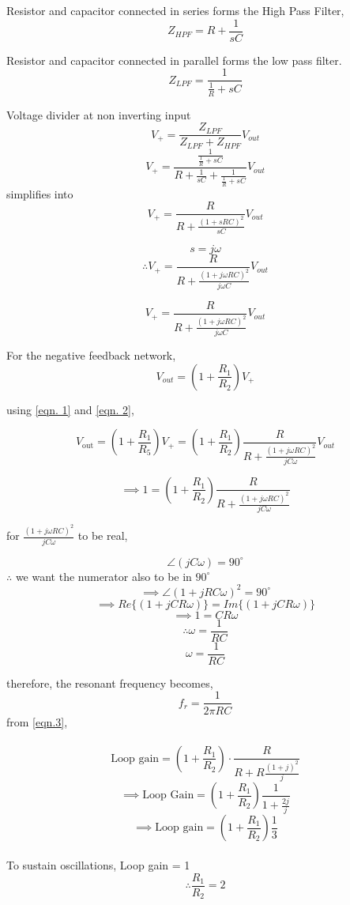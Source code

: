 Resistor and capacitor connected in series forms the High Pass Filter,
$$Z_{HPF} = R + \frac{1}{sC}$$

Resistor and capacitor connected in parallel forms the low pass filter.
$$Z_{LPF} = \frac{1}{\frac{1}{R} + sC}$$

Voltage divider at non inverting input
$$V_+ = \frac{Z_{LPF}}{Z_{LPF} + Z_{HPF}} V_{out}$$
$$V_+ = \frac{\frac{1}{\frac{1}{R} + sC}}{R + \frac{1}{sC} + \frac{1}{\frac{1}{R} + sC}} V_{out}$$
simplifies into
$$V_+ = \frac{R}{R + \frac{(1 + sRC)^2}{sC}} V_{out}$$


 $$s = j \omega $$
$$\therefore V_+ = \frac{R}{R + \frac{(1 + j \omega RC)^2}{j \omega C}} V_{out}$$

\begin{equation}
\boxed{V_+ = \frac{R}{R + \frac{(1 + j \omega RC)^2}{j \omega C}} V_{out}}
\label{eqn. 1}
\end{equation}


For the negative feedback network,
\begin{equation}
    \boxed{V_{out} = (1 + \frac{R_1}{R_2})V_+}
    \label{eqn. 2}
\end{equation}

using \cref{eqn. 1} and \cref{eqn. 2},

$$V_{\text{out}} = \left(1 + \frac{R_1}{R_5}\right) V_+ 
= (1 + \frac{R_1}{R_2}) \frac{R}{R + \frac{(1 + j\omega R C)^2}{jC\omega}} V_{out}$$

$$\implies 1 = (1 + \frac{R_1}{R_2})\frac{R}{R + \frac{(1 + j\omega R C)^2}{jC\omega}}$$

for $\frac{(1 + j\omega R C)^2}{jC\omega}$ to be real,

$$\angle(jC\omega) = 90^\circ$$
$\therefore$ we want the numerator also to be in $90^\circ$
$$\implies \angle(1 + jRC\omega)^2 = 90^\circ$$
$$\implies Re\{(1 + jCR\omega )\} = Im\{(1 + jCR\omega)\}$$
$$\implies 1 = CR\omega$$
$$\therefore \omega = \frac{1}{RC}$$
\begin{equation}
    \omega = \frac{1}{RC}
    \label{eqn.3}
\end{equation}

therefore, the resonant frequency becomes,
$$\boxed{f_r = \frac{1}{2\pi R C}}$$
from \cref{eqn.3},\\
\\
 \[
\text{Loop gain}= \left(1 + \frac{R_1}{R_2} \right) \cdot \frac{R}{R + R\frac{(1 + j)^2}{j}}
\]
$$\implies \text{Loop Gain} = {\left(1 + \frac{R_1}{R_2}\right)}\frac{1}{1 + \frac{2j}{j}}$$
$$\implies \text{Loop gain} = \left(1 + \frac{R_1}{R_2}\right)\frac{1}{3}$$
\\
To sustain oscillations, Loop gain = 1
$$\boxed{\therefore \frac{R_1}{R_2} = 2}$$

